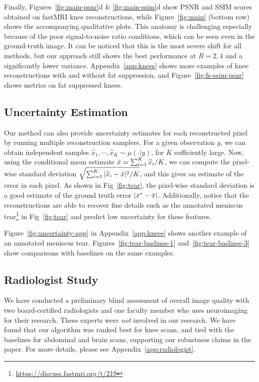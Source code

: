 \documentclass{article}
\newcounter{example}[section]
\newcommand{\wh}{\widehat}
\newcommand{\xhat}{\wh{x}}
\begin{document}
Finally, Figures~\ref{fig:main-psnr}d \& \ref{fig:main-ssim}d show PSNR and SSIM scores obtained on fastMRI knee reconstructions, while Figure~\ref{fig:main} (bottom row) shows the accompanying qualitative plots. This anatomy is challenging especially because of the poor signal-to-noise ratio conditions, which can be seen even in the ground-truth image. It can be noticed that this is the most severe shift for all methods, but our approach still shows the best performance at $R={2,4}$ and a significantly lower variance.
Appendix~\ref{app:knees} shows more examples of knee reconstructions with and without fat suppression, and Figure~\ref{fig:fs-ssim-psnr} shows metrics on fat suppressed knees. 

\subsection{Uncertainty Estimation}\label{sec:uncertainty}
Our method can also provide uncertainty estimates for each reconstructed pixel by running multiple reconstruction samplers. For a given observation $y$, we can obtain independent samples $\xhat_1, \cdots, \xhat_K \sim \mu(\cdot | y)$, for $K$ sufficiently large. Now, using the conditional mean estimate $\Bar{x} = \sum_{i=1}^K \xhat_i / K$, we can compute the pixel-wise standard deviation $\sqrt{\sum_{i=1}^K | \xhat_i - \Bar{x} |^2 / K}$, and this gives an estimate of the error in each pixel. As shown in Fig~\ref{fig:tear}, the pixel-wise standard deviation is a good estimate of the ground truth error $|x^* - \Bar{x}|$. Additionally, notice that the reconstructions are able to recover fine details such as the annotated meniscus tear\footnote{\url{https://discuss.fastmri.org/t/219}} in Fig~\ref{fig:tear} and predict low uncertainty for these features. 

Figure~\ref{fig:uncertainty-app} in Appendix~\ref{app:knees} shows another example of an annotated meniscus tear. Figures~\ref{fig:tear-baslines-1} and~\ref{fig:tear-baslines-3} show comparisons with baselines on the same examples.

\subsection{Radiologist Study}\label{sec:radiologist}
We have conducted a preliminary blind assessment of overall image quality with two board-certified radiologists and one faculty member who uses neuroimaging for their research. These experts were \emph{not} involved in our research. We have found that our algorithm was ranked best for knee scans, and tied with the baselines for abdominal and brain scans, supporting our robustness claims in the paper. For more details, please see Appendix~\ref{app:radiologist}.
\end{document}
